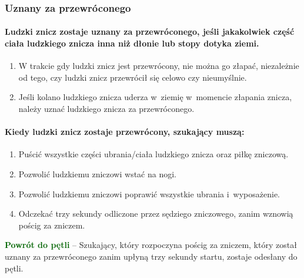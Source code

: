 \documentclass[12pt,a4paper]{article}
\newcommand\other[1]{\bgroup\textcolor{darkgreen}{\textbf{#1}}}
\begin{document}
\subsubsection{Uznany za przewróconego}

\paragraph{Ludzki znicz zostaje uznany za przewróconego, jeśli
	jakakolwiek część ciała ludzkiego znicza inna niż dłonie lub stopy
	dotyka ziemi.}

\begin{enumerate}
	\item W trakcie gdy ludzki znicz jest przewrócony, nie można go złapać,
	      niezależnie od tego, czy ludzki znicz przewrócił się celowo czy
	      nieumyślnie.

	\item Jeśli kolano ludzkiego znicza uderza w~ziemię w~momencie złapania
	      znicza, należy uznać ludzkiego znicza za przewróconego.
\end{enumerate}

\paragraph{Kiedy ludzki znicz zostaje przewrócony, szukający
	muszą:}

\begin{enumerate}
	\item Puścić wszystkie części ubrania/ciała ludzkiego znicza oraz piłkę
	      zniczową.

	\item Pozwolić ludzkiemu zniczowi wstać na nogi.

	\item Pozwolić ludzkiemu zniczowi poprawić wszystkie ubrania i~wyposażenie.

	\item Odczekać trzy sekundy odliczone przez sędziego zniczowego, zanim
	      wznowią pościg za zniczem.
\end{enumerate}

\other{Powrót do pętli} -- Szukający, który rozpoczyna pościg za zniczem,
który został uznany za przewróconego zanim upłyną trzy sekundy startu,
zostaje odesłany do pętli.
\end{document}
